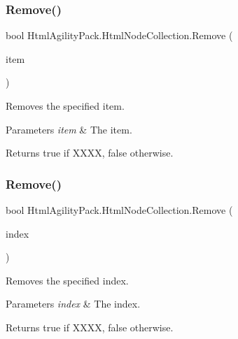 \subsubsection{\texorpdfstring{Remove()}{Remove()}\hspace{0.1cm}{\footnotesize\ttfamily [1/2]}}
{\footnotesize\ttfamily bool Html\+Agility\+Pack.\+Html\+Node\+Collection.\+Remove (\begin{DoxyParamCaption}\item[{\hyperlink{class_html_agility_pack_1_1_html_node}{Html\+Node}}]{item }\end{DoxyParamCaption})\hspace{0.3cm}{\ttfamily [inline]}}



Removes the specified item. 


\begin{DoxyParams}{Parameters}
{\em item} & The item.\\
\hline
\end{DoxyParams}
\begin{DoxyReturn}{Returns}
{\ttfamily true} if X\+X\+XX, {\ttfamily false} otherwise.
\end{DoxyReturn}
\mbox{\label{class_html_agility_pack_1_1_html_node_collection_a6ffb19c5be316377dcc9f53f45f70653}} 
\subsubsection{\texorpdfstring{Remove()}{Remove()}\hspace{0.1cm}{\footnotesize\ttfamily [2/2]}}
{\footnotesize\ttfamily bool Html\+Agility\+Pack.\+Html\+Node\+Collection.\+Remove (\begin{DoxyParamCaption}\item[{int}]{index }\end{DoxyParamCaption})\hspace{0.3cm}{\ttfamily [inline]}}



Removes the specified index. 


\begin{DoxyParams}{Parameters}
{\em index} & The index.\\
\hline
\end{DoxyParams}
\begin{DoxyReturn}{Returns}
{\ttfamily true} if X\+X\+XX, {\ttfamily false} otherwise.
\end{DoxyReturn}
\mbox{\label{class_html_agility_pack_1_1_html_node_collection_a727c555fa02ff5573eb375bc7cf657ac}} 
